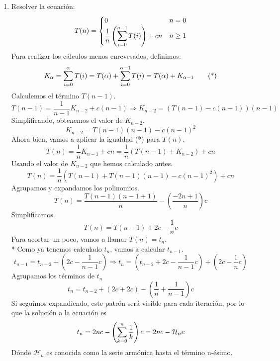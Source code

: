 \documentclass{article}
\begin{document}
\begin{enumerate}
\newpage 
		\item Resolver la ecuación:
		\[   
		T(n) = 
		\begin{cases}
		0 & n = 0\\
		\dfrac{1}{n}\left(\smashoperator[r]{\sum_{i=0}^{n-1}}T(i)\right)+cn & n \ge 1\\
		\end{cases}
		\]
		Para realizar los cálculos menos enrevesados, definimos:
		\[
			K_\alpha=\smashoperator[r]{\sum_{i=0}^{\alpha}}T(i)=T(\alpha)+\smashoperator[r]{\sum_{i=0}^{\alpha-1}}T(i)=T(\alpha)+K_{\alpha-1}\tag{*}
		\]
		Calculemos el término $T(n-1)$.
		\[
			T(n-1)=\dfrac{1}{n-1}K_{n-2}+c(n-1)\Rightarrow K_{n-2}=(T(n-1)-c(n-1))(n-1)
		\]
		Simplificando, obtenemos el valor de $K_{n-2}$.
		\[
			K_{n-2}=T(n-1)(n-1)-c(n-1)^2
		\]
		Ahora bien, vamos a aplicar la igualdad (*) para $T(n)$.
		\[
			T(n)=\dfrac{1}{n}K_{n-1}+cn=\dfrac{1}{n}(T(n-1)+K_{n-2})+cn
		\]
		Usando el valor de $K_{n-2}$ que hemos calculado antes.
		\[
			T(n)=\dfrac{1}{n}(T(n-1)+T(n-1)(n-1)-c(n-1)^2)+cn
		\]
		Agrupamos y expandamos los polinomios.
		\[
			T(n)=\dfrac{T(n-1)(n-1+1)}{n}-\left(\dfrac{-2n+1}{n}\right)c
		\]
		Simplificamos.
		\[
			T(n)=T(n-1)+2c-\dfrac{1}{n}c
		\]
		Para acortar un poco, vamos a llamar $T(n)=t_n$.\\* Como ya tenemos calculado $t_n$, vamos a calcular $t_{n-1}$.
		\[
			t_{n-1}=t_{n-2}+\left(2c-\dfrac{1}{n-1}c\right)\Rightarrow t_n=\left(t_{n-2}+2c-\dfrac{1}{n-1}c\right)+\left(2c-\dfrac{1}{n}c\right)
		\]
		Agrupamos los términos de $t_n$
		\[
			t_{n}=t_{n-2}+(2c + 2c)-\left(\dfrac{1}{n}+\dfrac{1}{n-1}\right)c
		\]
		Si seguimos expandiendo, este patrón será visible para cada iteración, por lo que la solución a la ecuación es
		\[
			t_n = 2nc - \left(\smashoperator[r]{\sum_{k=0}^{n}} \dfrac{1}{k}\right)c = 2nc - \mathcal{H}_n c
		\]
		Dónde $\mathcal{H}_n$ es conocida como la serie armónica hasta el término n-ésimo.
	\end{enumerate}
\end{document}
